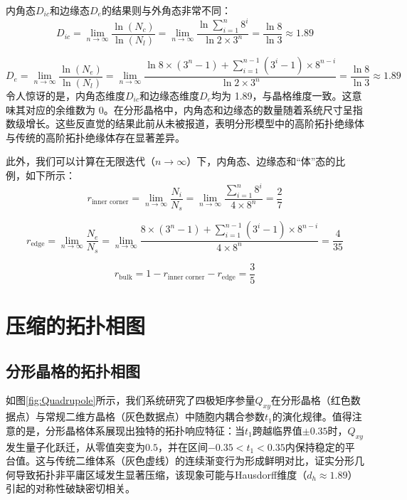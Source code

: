 内角态$D_{ic}$和边缘态$D_e$的结果则与外角态非常不同：
\begin{equation}
D_{ic}= \lim_{n \to \infty} \frac{\ln (N_c)}{\ln (N_l)} = \lim_{n \to \infty} \frac{\ln \sum_{i=1}^{n} 8^i}{\ln 2 \times 3^n} = \frac{\ln 8}{\ln 3} \approx 1.89
\end{equation}

\begin{equation}
D_e = \lim_{n \to \infty} \frac{\ln (N_e)}{\ln (N_l)} = \lim_{n \to \infty} \frac{\ln 8 \times (3^n - 1) + \sum_{i=1}^{n-1} (3^i - 1) \times 8^{n-i}}{\ln 2 \times 3^n} = \frac{\ln 8}{\ln 3} \approx 1.89
\end{equation}
令人惊讶的是，内角态维度$D_{ic}$和边缘态维度$D_e$均为 1.89，与晶格维度一致。这意味其对应的余维数为 0。在分形晶格中，内角态和边缘态的数量随着系统尺寸呈指数级增长。这些反直觉的结果此前从未被报道，表明分形模型中的高阶拓扑绝缘体与传统的高阶拓扑绝缘体存在显著差异。

此外，我们可以计算在无限迭代（\( n \to \infty \)）下，内角态、边缘态和“体”态的比例，如下所示：
\begin{equation}
r_{\text{inner corner}} = \lim_{n \to \infty} \frac{N_i}{N_s} = \lim_{n \to \infty} \frac{\sum_{i=1}^{n} 8^i}{4 \times 8^n} = \frac{2}{7}
\end{equation}

\begin{equation}
r_{\text{edge}} = \lim_{n \to \infty} \frac{N_e}{N_s} = \lim_{n \to \infty} \frac{8 \times (3^n - 1) + \sum_{i=1}^{n-1} (3^i - 1) \times 8^{n-i}}{4 \times 8^n} = \frac{4}{35}
\end{equation}

\begin{equation}
r_{\text{bulk}} = 1 - r_{\text{inner corner}} - r_{\text{edge}} = \frac{3}{5}
\end{equation}

\section{压缩的拓扑相图}
\subsection{分形晶格的拓扑相图}
如图\ref{fig:Quadrupole}所示，我们系统研究了四极矩序参量$Q_{xy}$在分形晶格（红色数据点）与常规二维方晶格（灰色数据点）中随胞内耦合参数$t_1$的演化规律。值得注意的是，分形晶格体系展现出独特的拓扑响应特征：当$t_1$跨越临界值$\pm 0.35$时，$Q_{xy}$发生量子化跃迁，从零值突变为$0.5$，并在区间$-0.35 < t_1 < 0.35$内保持稳定的平台值。这与传统二维体系（灰色虚线）的连续渐变行为形成鲜明对比，证实分形几何导致拓扑非平庸区域发生显著压缩，该现象可能与Hausdorff维度（$d_h \approx 1.89$）引起的对称性破缺密切相关。

